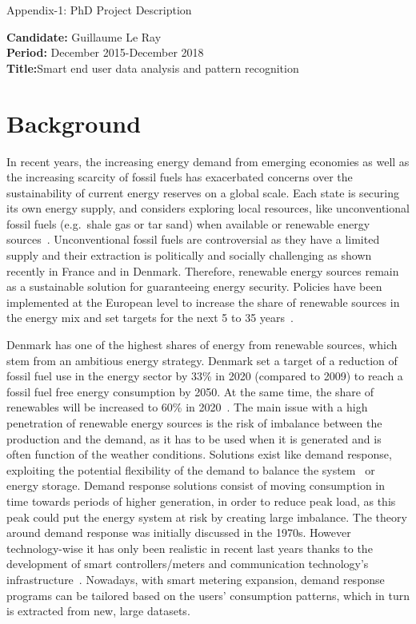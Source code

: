 \documentclass[fleqn,a4paper,twoside,10pt]{article}
\begin{document}
\begin{center}
\LARGE{Appendix-1: PhD Project Description}
\end{center}
\normalsize
\vspace{1cm}
{\bf Candidate:} Guillaume Le Ray\\
{\bf Period:} December 2015-December 2018\\
{\bf Title:}Smart end user data analysis and pattern recognition
\section{Background}
	In recent years, the increasing energy demand from emerging economies as well as the increasing scarcity of fossil fuels has exacerbated concerns over the sustainability of current energy reserves on a global scale. Each state is securing its own energy supply, and considers exploring local resources, like unconventional fossil fuels (e.g.\ shale gas or tar sand) when available or renewable energy sources~\cite{ramchurn2012}. Unconventional fossil fuels are controversial as they have a limited supply and their extraction is politically and socially challenging as shown recently in France and in Denmark. Therefore, renewable energy sources remain as a sustainable solution for guaranteeing energy security. Policies have been implemented at the European level to increase the share of renewable sources in the energy mix and set targets for the next 5 to 35 years~\cite{2020}.

	Denmark has one of the highest shares of energy from renewable sources, which stem from an ambitious energy strategy. Denmark set a target of a reduction of fossil fuel use in the energy sector by 33\% in 2020 (compared to 2009) to reach a fossil fuel free energy consumption by 2050. At the same time, the share of renewables will be increased to 60\% in 2020~\cite{2020DK}. The main issue with a high penetration of renewable energy sources is the risk of imbalance between the production and the demand, as it has to be used when it is generated and is often function of the weather conditions. Solutions exist like demand response, exploiting the potential flexibility of the demand to balance the system~\cite{Albadi2008} or energy storage. Demand response solutions consist of moving consumption in time towards periods of higher generation, in order to reduce peak load, as this peak could put the energy system at risk by creating large imbalance. The theory around demand response was initially discussed in the 1970s. However technology-wise it has only been realistic in recent last years thanks to the development of smart controllers/meters and communication technology's infrastructure~\cite{Strbac2008}. Nowadays, with smart metering expansion, demand response programs can be tailored based on the users' consumption patterns, which in turn is extracted from new, large datasets.
\end{document}
